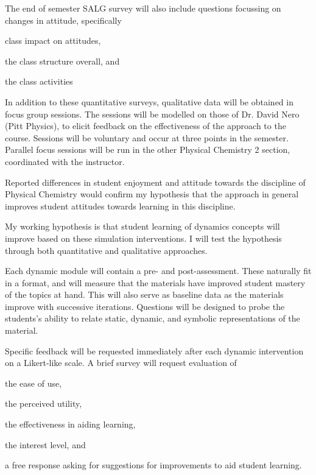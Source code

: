 \documentclass[10pt,letterpaper]{article}
\begin{document}
 The end of semester SALG survey will also include questions focussing on changes in attitude, specifically
\begin{enumerate*}[label=\textbf{\arabic*.)}]
  \item class impact on attitudes,
\item the class structure overall, and
\item the class activities
\end{enumerate*}

 In addition to these quantitative surveys, qualitative data will be obtained in focus group sessions. The sessions will be modelled on those of Dr. David Nero (Pitt Physics), to elicit feedback on the effectiveness of the \pogil approach to the course. Sessions will be voluntary and occur at three points in the semester. Parallel focus sessions will be run in the other Physical Chemistry 2 section, coordinated with the instructor. 

Reported differences in student enjoyment and attitude towards the discipline of Physical Chemistry would confirm my hypothesis that the \pogil approach in general improves student attitudes towards learning in this discipline. 

\label{aim:dynamics}
My working hypothesis is that student learning of dynamics concepts will improve based on these simulation interventions. I will test the hypothesis through both quantitative and qualitative approaches. 


 Each dynamic module will contain a pre- and post-assessment. These naturally fit in a \pogil format, and will measure that the materials have improved student mastery of the topics at hand. This will also serve as baseline data as the materials improve with successive iterations. Questions will be designed to probe the students's ability to relate static, dynamic, and symbolic representations of the material.


 Specific feedback will be requested immediately after each dynamic intervention on a Likert-like scale. A brief survey will request evaluation of
\begin{enumerate*}[label=\textbf{\arabic*.)}]
  \item the ease of use, 
\item the perceived utility, 
\item the effectiveness in aiding learning, 
\item the interest level, and  
\item a free response asking for suggestions for improvements to aid student learning.
\end{enumerate*}
\end{document}
